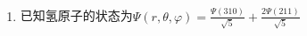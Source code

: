 
\subsection{ }
\begin{enumerate}
\item 已知氢原子的状态为$\varPsi (r,\theta,\varphi)=\frac{\varPsi (310)}{\sqrt{5}}+\frac{2\varPsi (211)}{\sqrt{5}}$
\end{enumerate}